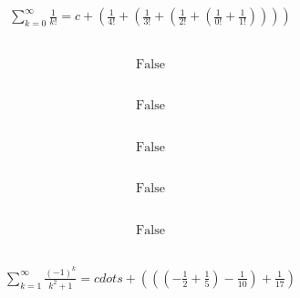 \documentclass[12pt]{article}
\begin{document}
\subsection{}
\begin{align*}
\sum_{k=0}^{\infty} \frac{1}{k!} = c + \left(\frac{1}{4!} + \left(\frac{1}{3!} + \left(\frac{1}{2!} + \left(\frac{1}{0!} + \frac{1}{1!}\right)\right)\right)\right)
\end{align*}
\vspace{1cm}
\subsection{}
\begin{align*}
\text{False}
\end{align*}
\vspace{1cm}
\subsection{}
\begin{align*}
\text{False}
\end{align*}
\vspace{1cm}
\subsection{}
\begin{align*}
\text{False}
\end{align*}
\vspace{1cm}
\subsection{}
\begin{align*}
\text{False}
\end{align*}
\vspace{1cm}
\subsection{}
\begin{align*}
\text{False}
\end{align*}
\vspace{1cm}
\subsection{}
\begin{align*}
\sum_{k=1}^{\infty} \frac{\left(-1\right)^{k}}{k^{2} + 1} = cdots + \left(\left(\left(- \frac{1}{2} + \frac{1}{5}\right) - \frac{1}{10}\right) + \frac{1}{17}\right)
\end{align*}
\vspace{1cm}
\end{document}
